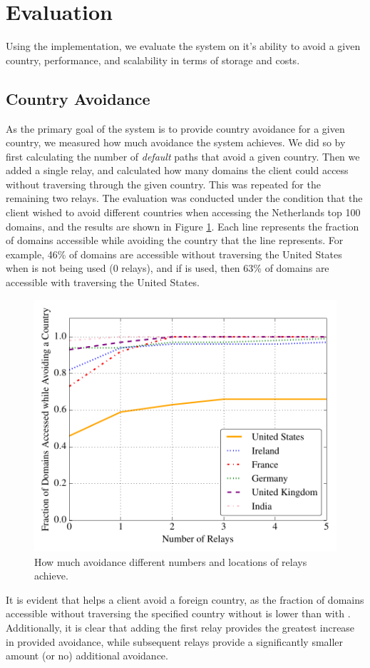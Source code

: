 \section{Evaluation}
Using the \system{} implementation, we evaluate the system on it's ability to avoid a given country, performance, and scalability in terms of storage and costs.

\subsection{Country Avoidance}
As the primary goal of the system is to provide country avoidance for a given 
country, we measured how much avoidance the system achieves.  We did so by first 
calculating the number of {\it default} paths that avoid a given country.  Then 
we added a single relay, and calculated how many domains the client could 
access without traversing through the given country.  This was repeated for 
the remaining two relays.  The evaluation was conducted under the condition that 
the client wished to avoid different countries when accessing the Netherlands top 
100 domains, and the results are shown in Figure \ref{fig:avoidance_eval}.  Each 
line represents the fraction of domains accessible while avoiding the country that 
the line represents.  For example, 46\% of domains are accessible without traversing 
the United States when \system{} is not being used (0 relays), and if \system{} is 
used, then 63\% of domains are accessible with traversing the United States.

\begin{figure}[b!]
\centering
\includegraphics[width=.5\textwidth]{avoidance_n_relays}
\caption{How much avoidance different numbers and locations of relays achieve.}
\label{fig:avoidance_eval}
\end{figure}

It is evident that \system{} helps a client avoid a foreign country, as the 
fraction of domains accessible without traversing 
the specified country without \system{} is lower than with \system{}.  Additionally, 
it is clear that adding the first relay provides the greatest increase in 
provided avoidance, while subsequent relays provide a significantly 
smaller amount (or no) additional avoidance.

